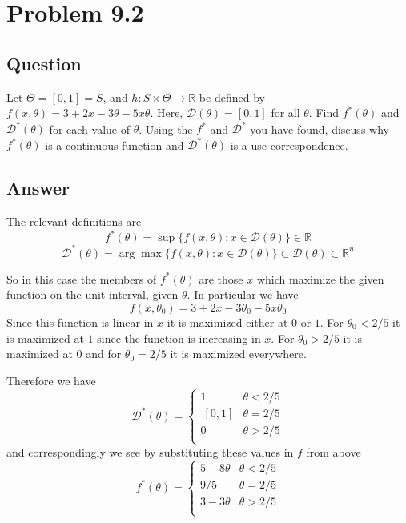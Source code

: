 \documentclass[12pt]{article}
\begin{document}
\section{Problem 9.2}
\subsection{Question}
Let $\Theta = [0,1] = S$, and $h: S \times \Theta \to \mathbb{R}$ be defined by $f(x,\theta) =3+2x-3 \theta -5x \theta$. Here, $\mathcal{D}(\theta) = [0,1]$ for all $\theta$. Find $f^*(\theta)$ and $\mathcal{D}^*(\theta)$ for each value of $\theta$. Using the $f^*$ and $\mathcal{D}^*$ you have found, discuss why $f^*(\theta)$ is a continuous function and $\mathcal{D}^*(\theta)$ is a usc correspondence.
\subsection{Answer}
The relevant definitions are 
\[ f^*(\theta) = \sup\{f(x,\theta) : x \in \mathcal{D}(\theta) \} \in \mathbb{R}\]
\[\mathcal{D}^*(\theta) = \arg \max\{ f(x,\theta) : x \in \mathcal{D}(\theta) \} \subset \mathcal{D}(\theta) \subset \mathbb{R}^n\]

So in this case the members of $f^*(\theta)$ are those $x$ which maximize the given function on the unit interval, given $\theta$. In particular we have 
\[f(x,\theta_0) = 3+2x-3\theta_0-5x\theta_0 \]
Since this function is linear in $x$ it is maximized either at $0$ or $1$. For $\theta_0<2/5$ it is maximized at $1$ since the function is increasing in $x$. For $\theta_0 > 2/5$ it is maximized at $0$ and for $\theta_0 = 2/5$ it is maximized everywhere.

Therefore we have 
\[\mathcal{D}^*(\theta) = \left\{ \begin{array}{ll} 1& \theta<2/5 \\ \ \!\! [0,1] & \theta = 2/5 \\ 0 & \theta>2/5 \\ \end{array}\right.\]
and correspondingly we see by substituting these values in $f$ from above
\[f^*(\theta) = \left\{ \begin{array}{ll} 5-8\theta & \theta<2/5 \\ 9/5& \theta = 2/5 \\ 3-3\theta & \theta>2/5 \\ \end{array}\right.\]
\end{document}
